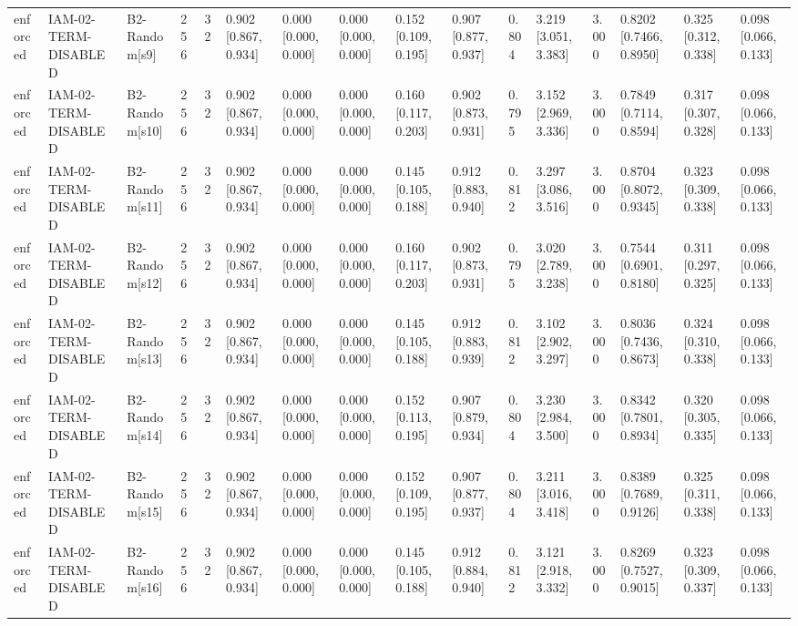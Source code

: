 \begin{table}[!ht]
{\begin{tabular}{llllllllllllllll}
enforced & IAM-02-TERM-DISABLED & B2-Random[s9] & 256 & 32 & 0.902 [0.867, 0.934] & 0.000 [0.000, 0.000] & 0.000 [0.000, 0.000] & 0.152 [0.109, 0.195] & 0.907 [0.877, 0.937] & 0.804 & 3.219 [3.051, 3.383] & 3.000 & 0.8202 [0.7466, 0.8950] & 0.325 [0.312, 0.338] & 0.098 [0.066, 0.133] \\
enforced & IAM-02-TERM-DISABLED & B2-Random[s10] & 256 & 32 & 0.902 [0.867, 0.934] & 0.000 [0.000, 0.000] & 0.000 [0.000, 0.000] & 0.160 [0.117, 0.203] & 0.902 [0.873, 0.931] & 0.795 & 3.152 [2.969, 3.336] & 3.000 & 0.7849 [0.7114, 0.8594] & 0.317 [0.307, 0.328] & 0.098 [0.066, 0.133] \\
enforced & IAM-02-TERM-DISABLED & B2-Random[s11] & 256 & 32 & 0.902 [0.867, 0.934] & 0.000 [0.000, 0.000] & 0.000 [0.000, 0.000] & 0.145 [0.105, 0.188] & 0.912 [0.883, 0.940] & 0.812 & 3.297 [3.086, 3.516] & 3.000 & 0.8704 [0.8072, 0.9345] & 0.323 [0.309, 0.338] & 0.098 [0.066, 0.133] \\
enforced & IAM-02-TERM-DISABLED & B2-Random[s12] & 256 & 32 & 0.902 [0.867, 0.934] & 0.000 [0.000, 0.000] & 0.000 [0.000, 0.000] & 0.160 [0.117, 0.203] & 0.902 [0.873, 0.931] & 0.795 & 3.020 [2.789, 3.238] & 3.000 & 0.7544 [0.6901, 0.8180] & 0.311 [0.297, 0.325] & 0.098 [0.066, 0.133] \\
enforced & IAM-02-TERM-DISABLED & B2-Random[s13] & 256 & 32 & 0.902 [0.867, 0.934] & 0.000 [0.000, 0.000] & 0.000 [0.000, 0.000] & 0.145 [0.105, 0.188] & 0.912 [0.883, 0.939] & 0.812 & 3.102 [2.902, 3.297] & 3.000 & 0.8036 [0.7436, 0.8673] & 0.324 [0.310, 0.338] & 0.098 [0.066, 0.133] \\
enforced & IAM-02-TERM-DISABLED & B2-Random[s14] & 256 & 32 & 0.902 [0.867, 0.934] & 0.000 [0.000, 0.000] & 0.000 [0.000, 0.000] & 0.152 [0.113, 0.195] & 0.907 [0.879, 0.934] & 0.804 & 3.230 [2.984, 3.500] & 3.000 & 0.8342 [0.7801, 0.8934] & 0.320 [0.305, 0.335] & 0.098 [0.066, 0.133] \\
enforced & IAM-02-TERM-DISABLED & B2-Random[s15] & 256 & 32 & 0.902 [0.867, 0.934] & 0.000 [0.000, 0.000] & 0.000 [0.000, 0.000] & 0.152 [0.109, 0.195] & 0.907 [0.877, 0.937] & 0.804 & 3.211 [3.016, 3.418] & 3.000 & 0.8389 [0.7689, 0.9126] & 0.325 [0.311, 0.338] & 0.098 [0.066, 0.133] \\
enforced & IAM-02-TERM-DISABLED & B2-Random[s16] & 256 & 32 & 0.902 [0.867, 0.934] & 0.000 [0.000, 0.000] & 0.000 [0.000, 0.000] & 0.145 [0.105, 0.188] & 0.912 [0.884, 0.940] & 0.812 & 3.121 [2.918, 3.332] & 3.000 & 0.8269 [0.7527, 0.9015] & 0.323 [0.309, 0.337] & 0.098 [0.066, 0.133] \\

\end{tabular}}
\end{table}
